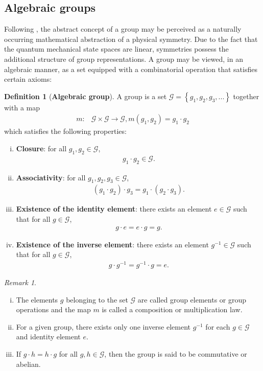 \documentclass[12pt,a4paper]{report}
\theoremstyle{definition}
\newtheorem{definition}{Definition}
\theoremstyle{remark}
\newtheorem*{remark}{Remark}
\theoremstyle{remark}
\begin{document}
\subsection{Algebraic groups}
Following \cite{singer}, the abstract concept of a group may be perceived as a naturally occurring mathematical abstraction of a physical symmetry. Due to the fact that the quantum mechanical state spaces are linear, symmetries possess the additional structure of group representations. A group may be viewed, in an algebraic manner, as a set equipped with a combinatorial operation that satisfies certain axioms:
\begin{definition}[\textbf{Algebraic group}]
A group is a set $\mathcal{G}=\left\lbrace g_1,g_2,g_3,... \right\rbrace$ together with a map
\begin{align*}
m:&\mathcal{G}\times\mathcal{G}\rightarrow\mathcal{G},m(g_1,g_2)=g_1\cdot g_2
\end{align*}
which satisfies the following properties:
\begin{enumerate}[i.]
\item \textbf{Closure}: for all $g_1,g_2\in\mathcal{G}$, 
\begin{align*}
g_1\cdot g_2\in\mathcal{G}.
\end{align*}
\item \textbf{Associativity}: for all $g_1,g_2,g_3\in\mathcal{G}$,
\begin{align*}
(g_1\cdot g_2)\cdot g_3=g_1\cdot(g_2\cdot g_3).
\end{align*}
\item \textbf{Existence of the identity element}: there exists an element $e\in\mathcal{G}$ such that for all $g\in\mathcal{G}$,
\begin{align*}
g\cdot e=e\cdot g=g.
\end{align*}
\item \textbf{Existence of the inverse element}: there exists an element $g^{-1}\in\mathcal{G}$ such that for all $g\in\mathcal{G}$,
\begin{align*}
g\cdot g^{-1}=g^{-1}\cdot g=e.
\end{align*}
\end{enumerate}
\end{definition}
\begin{remark}\mbox{}
\begin{enumerate}[i.]
\item The elements $g$ belonging to the set $\mathcal{G}$ are called group elements or group operations and the map $m$ is called a composition or multiplication law.
\item For a given group, there exists only one inverse element $g^{-1}$ for each $g\in\mathcal{G}$ and identity element $e$.
\item If $g\cdot h=h\cdot g$ for all $g,h\in\mathcal{G}$, then the group is said to be commutative or abelian.
\end{enumerate}
\end{remark}
\end{document}
